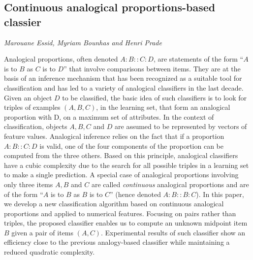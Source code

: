 \documentclass[../booklet.tex]{subfiles}
\begin{document}
\subsection[Continuous analogical proportions-based classier. {\it Marouane Essid, Myriam Bounhas and Henri Prade}]{Continuous analogical proportions-based classier}
  

\begin{center}
  {\it Marouane Essid, Myriam Bounhas and Henri Prade}
\end{center}

\vskip 0.8cm


Analogical proportions, often denoted $A:B::C:D$,  are statements of the form ``$A$ is to $B$ as $C$ is to $D$'' that involve comparisons between items. They are at the basis of an inference mechanism that has been recognized as a suitable tool for classification and has led to a variety of analogical classifiers in the last decade. Given an object $D$ to be classified, the basic idea of such classifiers is to look
for triples of examples $(A, B, C)$, in the learning set, that form an analogical proportion with D, on a maximum set of attributes. In the context of classification, objects $A, B, C$ and $D$ are assumed to be represented by vectors of feature values. Analogical inference relies on the fact that if a proportion $A:B::C:D$ is valid, one of the four components of the proportion can be computed from the three others. Based on this principle, analogical classifiers have a cubic complexity due to the search for all possible triples in a learning set to make a single prediction.
A special case of analogical proportions involving only three items $A, B$ and $C$ are called \textit{continuous} analogical proportions and are of the form ``$A$ is to $B$ as $B$ is to $C$'' (hence  denoted $A:B::B:C$). In this paper, we develop a new classification algorithm based on continuous analogical proportions and applied to numerical features. Focusing on pairs rather than triples, the proposed classifier enables us to compute an unknown midpoint item $B$ given a pair of items $(A,C)$. Experimental results of such classifier show an efficiency close to the previous analogy-based classifier while maintaining a reduced quadratic complexity.

\end{document}
